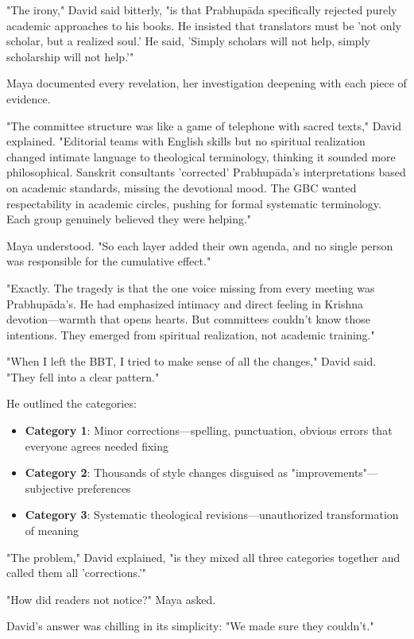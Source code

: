 \documentclass[12pt,twoside]{book}
\begin{document}
"The irony," David said bitterly, "is that Prabhupāda specifically rejected purely academic approaches to his books. He insisted that translators must be 'not only scholar, but a realized soul.' He said, 'Simply scholars will not help, simply scholarship will not help.'"

Maya documented every revelation, her investigation deepening with each piece of evidence.

"The committee structure was like a game of telephone with sacred texts," David explained. "Editorial teams with English skills but no spiritual realization changed intimate language to theological terminology, thinking it sounded more philosophical. Sanskrit consultants 'corrected' Prabhupāda's interpretations based on academic standards, missing the devotional mood. The GBC wanted respectability in academic circles, pushing for formal systematic terminology. Each group genuinely believed they were helping."

Maya understood. "So each layer added their own agenda, and no single person was responsible for the cumulative effect."

"Exactly. The tragedy is that the one voice missing from every meeting was Prabhupāda's. He had emphasized intimacy and direct feeling in Krishna devotion—warmth that opens hearts. But committees couldn't know those intentions. They emerged from spiritual realization, not academic training."

"When I left the BBT, I tried to make sense of all the changes," David said. "They fell into a clear pattern."

He outlined the categories:
\begin{itemize}
\item \textbf{\textbf{Category 1}}: Minor corrections—spelling, punctuation, obvious errors that everyone agrees needed fixing
\item \textbf{\textbf{Category 2}}: Thousands of style changes disguised as "improvements"—subjective preferences
\item \textbf{\textbf{Category 3}}: Systematic theological revisions—unauthorized transformation of meaning
\end{itemize}

"The problem," David explained, "is they mixed all three categories together and called them all 'corrections.'"

"How did readers not notice?" Maya asked.

David's answer was chilling in its simplicity: "We made sure they couldn't."
\end{document}
